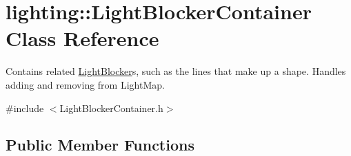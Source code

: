 \hypertarget{classlighting_1_1LightBlockerContainer}{}\section{lighting\+:\+:Light\+Blocker\+Container Class Reference}
\label{classlighting_1_1LightBlockerContainer}


Contains related \hyperlink{classlighting_1_1LightBlocker}{Light\+Blocker}s, such as the lines that make up a shape. Handles adding and removing from Light\+Map.  




{\ttfamily \#include $<$Light\+Blocker\+Container.\+h$>$}

\subsection*{Public Member Functions}
